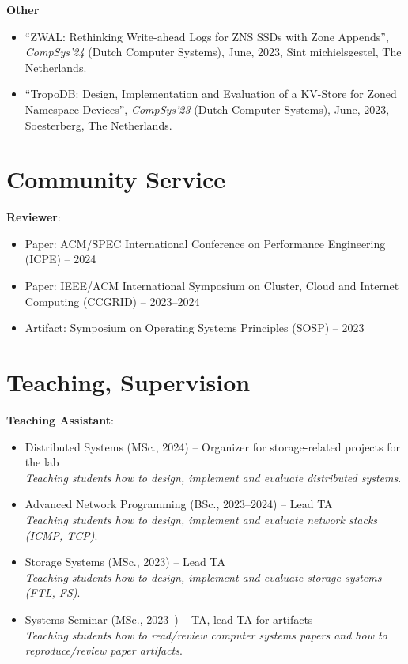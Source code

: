 \documentclass[letterpaper,11pt]{article}
\begin{document}
    \textbf{Other}
    \begin{itemize}[label={}]
    \item
      ``ZWAL: Rethinking Write-ahead Logs for ZNS SSDs with Zone Appends'',
      \textit{CompSys'24} (Dutch Computer Systems), June, 2023, Sint michielsgestel, The Netherlands.
    
    \item
      ``TropoDB: Design, Implementation and Evaluation of a KV-Store for Zoned Namespace Devices'',
      \textit{CompSys'23} (Dutch Computer Systems), June, 2023, Soesterberg, The Netherlands.
    \end{itemize}

\section{Community Service}
\textbf{Reviewer}:
\begin{itemize}
\itemsep0em
\item Paper: ACM/SPEC International Conference on Performance Engineering (ICPE) -- 2024
\item Paper: IEEE/ACM International Symposium on Cluster, Cloud and Internet Computing (CCGRID) -- 2023--2024
\item Artifact: Symposium on Operating Systems Principles (SOSP) -- 2023
\end{itemize}

\section{Teaching, Supervision}
\textbf{Teaching Assistant}:
\begin{itemize}[label={}]
\itemsep0em
  \item Distributed Systems (MSc., 2024) -- Organizer for storage-related projects for the lab \\
  \textit{Teaching students how to design, implement and evaluate distributed systems}.
  
  \item Advanced Network Programming (BSc., 2023--2024) -- Lead TA\\
  \textit{Teaching students how to design, implement and evaluate network stacks (ICMP, TCP)}.

  \item Storage Systems (MSc., 2023) -- Lead TA\\
  \textit{Teaching students how to design, implement and evaluate storage systems (FTL, FS)}.

  \item Systems Seminar (MSc., 2023--) -- TA, lead TA for artifacts\\
  \textit{Teaching students how to read/review computer systems papers and how to reproduce/review paper artifacts}.
\end{itemize}
\end{document}
